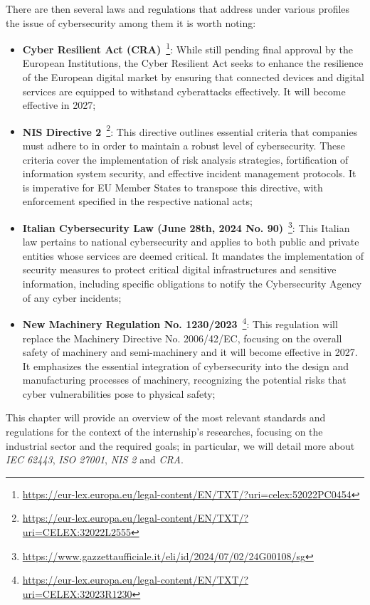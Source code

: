There are then several laws and regulations that address under various profiles the issue of cybersecurity among them it is worth noting:~\cite{cybersecurity-standards-regulations-compliance}
\begin{itemize}
  \item \textbf{Cyber Resilient Act (CRA)}~\footnote{\url{https://eur-lex.europa.eu/legal-content/EN/TXT/?uri=celex:52022PC0454}}: While still pending final approval by the European Institutions, the Cyber Resilient Act seeks to enhance the resilience of the European digital market by ensuring that connected devices and digital services are equipped to withstand cyberattacks effectively. It will become effective in 2027;
  \item  \textbf{NIS Directive 2}~\footnote{\url{https://eur-lex.europa.eu/legal-content/EN/TXT/?uri=CELEX:32022L2555}}: This directive outlines essential criteria that companies must adhere to in order to maintain a robust level of cybersecurity. These criteria cover the implementation of risk analysis strategies, fortification of information system security, and effective incident management protocols. It is imperative for EU Member States to transpose this directive, with enforcement specified in the respective national acts;
  \item \textbf{Italian Cybersecurity Law (June 28th, 2024 No. 90)}~\footnote{\url{https://www.gazzettaufficiale.it/eli/id/2024/07/02/24G00108/sg}}: This Italian law pertains to national cybersecurity and applies to both public and private entities whose services are deemed critical. It mandates the implementation of security measures to protect critical digital infrastructures and sensitive information, including specific obligations to notify the Cybersecurity Agency of any cyber incidents;
  \item \textbf{New Machinery Regulation No. 1230/2023}~\footnote{\url{https://eur-lex.europa.eu/legal-content/EN/TXT/?uri=CELEX:32023R1230}}: This regulation will replace the Machinery Directive No. 2006/42/EC, focusing on the overall safety of machinery and semi-machinery and it will become effective in 2027. It emphasizes the essential integration of cybersecurity into the design and manufacturing processes of machinery, recognizing the potential risks that cyber vulnerabilities pose to physical safety;
\end{itemize}

This chapter will provide an overview of the most relevant standards and regulations for the context of the internship's researches, focusing on the industrial sector and the required goals; in particular, we will detail more about \textit{IEC 62443}, \textit{ISO 27001}, \textit{NIS 2} and \textit{CRA}.


